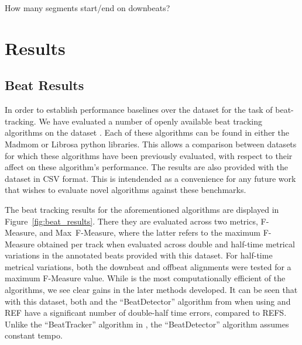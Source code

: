 \documentclass{article}
\begin{document}
How many segments start/end on downbeats?

\section{Results}\label{sec:results}

\subsection{Beat Results}

In order to establish performance baselines over the dataset for the task of beat-tracking. We have evaluated a number of openly available beat
tracking algorithms on the dataset \cite{Ellis2007, Krebs2015, Korzeniowski2014, Bock2011}. Each of these algorithms can be found in either the
Madmom \cite{Bock2016b} or Librosa \cite{Mcfee2015a} python libraries. This allows a comparison between datasets for which these algorithms have been previously evaluated,
with respect to their affect on these algorithm's performance. The results are also provided with the dataset in CSV format. This is intendended
as a convenience for any future work that wishes to evaluate novel algorithms against these benchmarks.

The beat tracking results for the aforementioned algorithms are displayed in Figure~\ref{fig:beat_results}. There they are evaluated across two metrics,
F-Measure, and Max~F-Measure, where the latter refers to the maximum F-Measure obtained per track when evaluated across double and half-time metrical variations
in the annotated beats provided with this dataset. For half-time metrical variations, both the downbeat and offbeat alignments were tested for a maximum F-Measure
value. While \cite{Ellis2007} is the most computationally efficient of the algorithms, we see clear gains in the later methods developed. It can be seen that with 
this dataset, both \cite{Ellis2007} and the ``BeatDetector'' algorithm from \cite{Bock2011} when using  and REF have a significant number of double-half time errors, compared to REFS.
Unlike the ``BeatTracker'' algorithm in \cite{Bock2011}, the ``BeatDetector'' algorithm assumes constant tempo.
\end{document}
